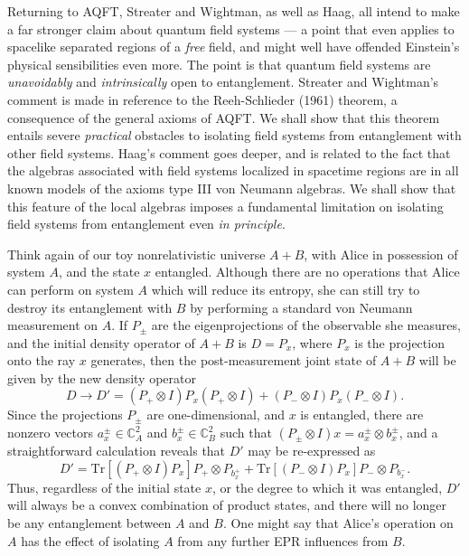 \documentclass[12pt]{article}
\begin{document}
Returning to AQFT, Streater and Wightman, as well as
Haag, all intend to make a far stronger claim about quantum field systems 
--- a point that even 
applies to spacelike separated regions of a \emph{free} 
field, and might well have offended Einstein's physical sensibilities 
even
more.  The point is that quantum field systems
 are \emph{unavoidably} and \emph{intrinsically} open to entanglement.  
 Streater and Wightman's comment is made in reference to the 
 Reeh-Schlieder (1961) theorem, 
 a consequence of the general 
axioms of AQFT.  We shall show
 that this theorem entails severe \emph{practical} obstacles to isolating 
 field systems from entanglement with other field systems.  Haag's comment goes deeper, and  
 is related to the fact that the algebras associated with 
field systems localized in spacetime regions are in all known models 
of the axioms type III von Neumann algebras.  We shall show 
that this feature of the local algebras imposes
 a fundamental limitation on isolating field systems from entanglement even 
\emph{in principle}.
 
Think again of our toy 
nonrelativistic universe $A+B$, 
with Alice in possession of system $A$, and the
state $x$ 
entangled.  Although there 
are no operations that Alice can perform on system $A$ which 
will reduce its entropy, she can still try to destroy its entanglement with 
$B$ by performing a standard von Neumann measurement 
on $A$.  If $P_{\pm}$ are the eigenprojections of the 
observable she measures, and the initial density operator of $A+B$ is 
$D=P_{x}$, where $P_{x}$ is the projection onto the ray $x$ 
generates, then the post-measurement joint state of $A+B$ will be given 
by the new 
density operator 
\begin{equation} \label{eq:Alice1} 
D \rightarrow D' = (P_{+}\otimes I) P_{x}(P_{+}\otimes I)+(P_{-}\otimes 
I)P_{x}(P_{-}\otimes I). 
\end{equation}
Since the projections $P_{\pm}$ are one-dimensional, and $x$ is 
entangled, there are 
nonzero vectors $a_{x}^{\pm}\in \mathbb{C}_{A}^{2}$ and 
$b_{x}^{\pm}\in \mathbb{C}_{B}^{2}$ such that
$(P_{\pm}\otimes I)x= 
  a_{x}^{\pm}\otimes b_{x}^{\pm}$, and a straightforward calculation 
  reveals that $D'$ may be re-expressed as 
\begin{equation}  \label{eq:Alice2}
D' = \mbox{Tr}[(P_{+}\otimes I)P_{x}]P_{+}\otimes 
P_{b_{x}^{+}}+\mbox{Tr}[(P_{-}\otimes I)P_{x}]P_{-}\otimes 
P_{b_{x}^{-}}.
\end{equation}
Thus, regardless of the initial state $x$, or the degree to which 
it was 
entangled, $D'$ will always be a convex 
combination of product states, and there will no longer be any entanglement between 
$A$ and $B$.  
One might say that Alice's operation on $A$ 
has the effect of isolating $A$ from any further
EPR influences from $B$.  
\end{document}
